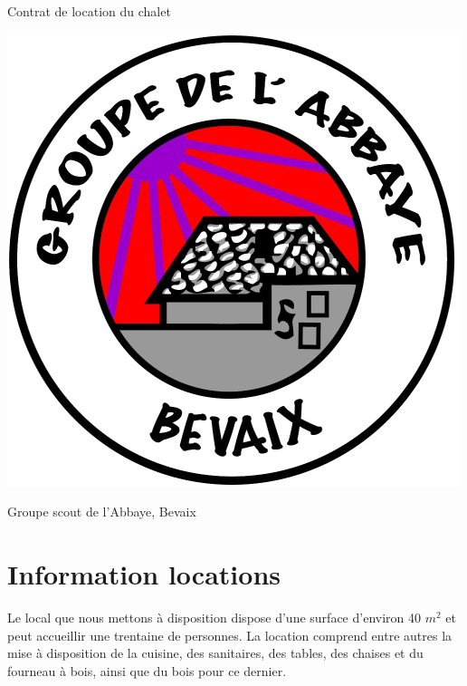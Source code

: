 \documentclass[a4paper,12pt]{extarticle}
\begin{document}
\pagestyle{fancy}
\fancyhead{}
\fancyfoot{}
\fancyfoot[RO,RE]{\thepage}


\begin{titlepage}
    \begin{center}
        \Huge Contrat de location du chalet

        \vspace{3cm}
        \includegraphics{../../logos/Logo_Abbaye_500.png}
        \vspace{3cm}

        \huge Groupe scout de l'Abbaye, Bevaix 
    \end{center}
\end{titlepage}


\section{Information locations}

Le local que nous mettons à disposition dispose d'une surface d'environ 40 $m^2$ et peut accueillir une trentaine de personnes.
La location comprend entre autres la mise à disposition de la cuisine, des sanitaires, des tables, des chaises et du fourneau à bois, ainsi que du bois pour ce dernier.
\end{document}
